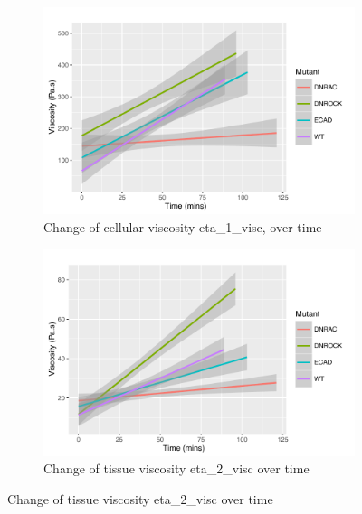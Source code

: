  \begin{figure}
 \centering
 \hfill
  \begin{subfigure}[t]{1\linewidth}
   \centering
   \includegraphics{Chapters/tweezers/Figs/PDF/Cells_-_Time}
   \caption{Change of cellular viscosity \gls{eta_1_visc}, over time}\label{fig:cells_time}
  \end{subfigure}\hfill
   \begin{subfigure}[t]{1\linewidth}
    \centering
    \includegraphics{Chapters/tweezers/Figs/PDF/Tissue_-_Time}
    \caption{Change of tissue viscosity \gls{eta_2_visc} over time}\label{fig:tissue_time}
   \end{subfigure}\hfill
\end{figure}
